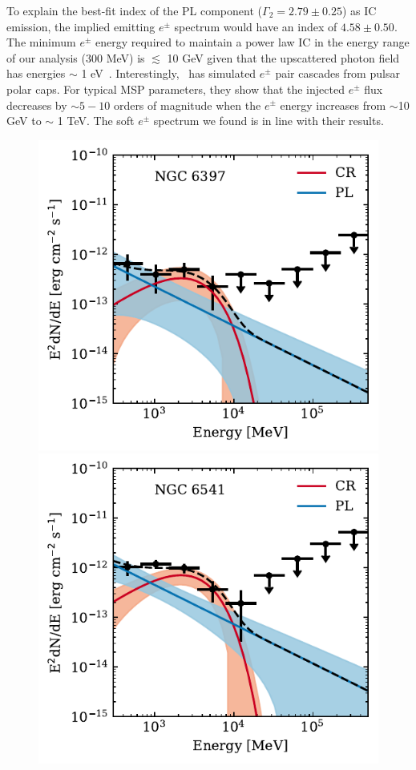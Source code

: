 \documentclass[doublespace,nopageskip]{VTthesis} %
\begin{document}
To explain the best-fit index of the {PL} component ($\Gamma_2 = 2.79 \pm 0.25$) {as IC emission}, the implied emitting $e^\pm$ spectrum would have an index of $4.58 \pm 0.50$. The minimum $e^\pm$ energy required to maintain a power law IC in the energy range of our analysis (300 MeV) is $\lesssim$ 10 GeV given that the upscattered photon field has energies $\sim$ 1 eV~\citep{1970RvMP...42..237B}. Interestingly,~\citet{2011ApJ...743..181H} has simulated $e^{\pm}$ pair cascades from pulsar polar caps. For typical MSP parameters, they show that the injected $e^\pm$ flux decreases by $\sim 5 - 10$ orders of magnitude when the $e^\pm$ energy increases from $\sim$10 GeV to $\sim$ 1 TeV. The soft $e^\pm$ spectrum we found is in line with their results.

\begin{figure}
    \centering
    \includegraphics[width=1\columnwidth]{Figures/Globular/spectra/2comp_16.pdf}
    \includegraphics[width=1\columnwidth]{Figures/Globular/spectra/2comp_21.pdf}

\end{figure}
\end{document}
